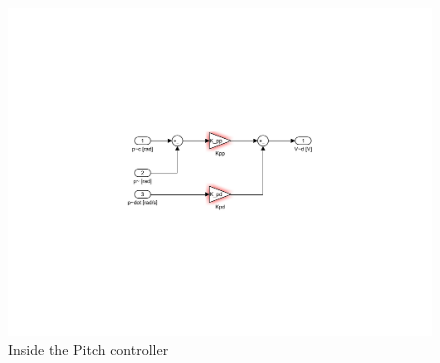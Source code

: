 \begin{figure}[!!ht!!!!!!!!tb!!]
	\centering
		\includegraphics[scale=0.9, trim={6.2cm 8cm 0cm 4cm},clip]{figures/simulink/PD_controller.pdf}
	\caption{Inside the Pitch controller}
\label{fig:P2p1_controller}
\end{figure}
\clearpage
